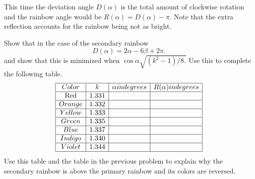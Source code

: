 This time the deviation angle $D(\alpha)$ is the total amount of clockwise
rotation and the rainbow angle would be $R(\alpha)=D(\alpha)-\pi.$  Note that the
extra reflection accounts for the rainbow being not as bright.

\begin{myproblem}{}
  Show that in the case of the secondary rainbow
$$
D(\alpha)=2\alpha-6\beta+2\pi.
$$
and show that this is minimized when $\cos\alpha\sqrt{(k^2-1)/8.}$ Use
this to complete the following table.
$$  
  \begin{array}[c]{|c|c|c|c|}
    \hline{}
    Color&k&\alpha in degrees&R(\alpha) in degrees\\\hline
     \text{Red}&1.331&&\\\hline
    Orange&1.332&&\\\hline
    Yellow&1.333&&\\\hline
    Green&1.335&&\\\hline
    Blue&1.337&&\\\hline
    Indigo&1.340&&\\\hline
    Violet&1.344&&\\\hline
  \end{array}
$$
Use this table and the table in the previous problem to explain why the secondary
rainbow is above the primary rainbow and its colors are reversed.
\end{myproblem}


